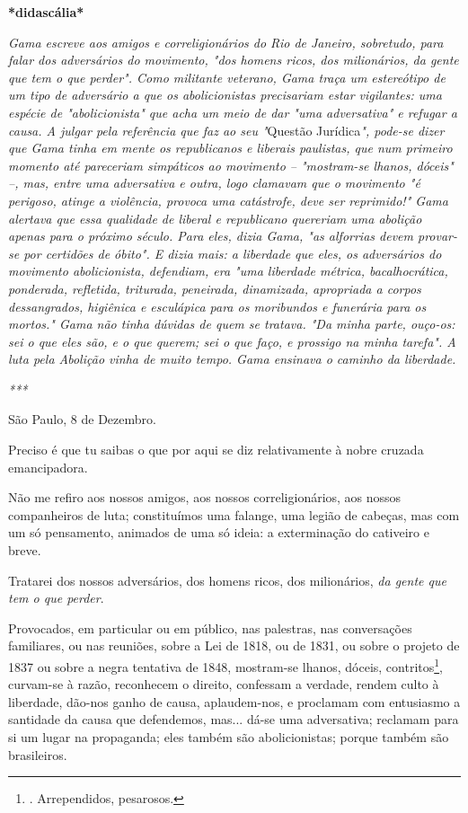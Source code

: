 \textbf{*didascália*}

\emph{Gama escreve aos amigos e correligionários do Rio de Janeiro,
sobretudo, para falar dos adversários do movimento, "dos homens ricos,
dos milionários, da gente que tem o que perder". Como militante
veterano, Gama traça um estereótipo de um tipo de adversário a que os
abolicionistas precisariam estar vigilantes: uma espécie de
"abolicionista" que acha um meio de dar "uma adversativa" e refugar a
causa. A julgar pela referência que faz ao seu "}Questão
Jurídica\emph{", pode-se dizer que Gama tinha em mente os republicanos e
liberais paulistas, que num primeiro momento até pareceriam simpáticos
ao movimento -- "mostram-se lhanos, dóceis" --, mas, entre uma
adversativa e outra, logo clamavam que o movimento "é perigoso, atinge a
violência, provoca uma catástrofe, deve ser reprimido!" Gama alertava
que essa qualidade de liberal e republicano quereriam uma abolição
apenas para o próximo século. Para eles, dizia Gama, "as alforrias devem
provar-se por certidões de óbito". E dizia mais: a liberdade que eles,
os adversários do movimento abolicionista, defendiam, era "uma liberdade
métrica, bacalhocrática, ponderada, refletida, triturada, peneirada,
dinamizada, apropriada a corpos dessangrados, higiênica e esculápica
para os moribundos e funerária para os mortos." Gama não tinha dúvidas
de quem se tratava. "Da minha parte, ouço-os: sei o que eles são, e o
que querem; sei o que faço, e prossigo na minha tarefa". A luta pela
Abolição vinha de muito tempo. Gama ensinava o caminho da liberdade. }

\emph{***}

São Paulo, 8 de Dezembro.

Preciso é que tu saibas o que por aqui se diz relativamente à nobre
cruzada emancipadora.

Não me refiro aos nossos amigos, aos nossos correligionários, aos nossos
companheiros de luta; constituímos uma falange, uma legião de cabeças,
mas com um só pensamento, animados de uma só ideia: a exterminação do
cativeiro e breve.

Tratarei dos nossos adversários, dos homens ricos, dos milionários,
\emph{da gente que tem o que perder}.

Provocados, em particular ou em público, nas palestras, nas conversações
familiares, ou nas reuniões, sobre a Lei de 1818, ou de 1831, ou sobre o
projeto de 1837 ou sobre a negra tentativa de 1848, mostram-se lhanos,
dóceis, contritos\footnote{. Arrependidos, pesarosos.}, curvam-se à
razão, reconhecem o direito, confessam a verdade, rendem culto à
liberdade, dão-nos ganho de causa, aplaudem-nos, e proclamam com
entusiasmo a santidade da causa que defendemos, mas... dá-se uma
adversativa; reclamam para si um lugar na propaganda; eles também são
abolicionistas; porque também são brasileiros.

